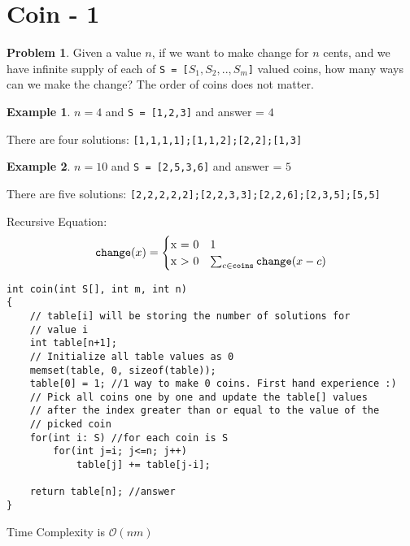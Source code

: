 \documentclass[twoside,12pt,a4paper,english]{book}
\theoremstyle{definition}
\newtheorem*{exmp}{Example}
\theoremstyle{problemstyle}
\newtheorem*{problem}{Problem} %
\theoremstyle{problemstyle}
\theoremstyle{problemstyle}
\begin{document}
\section{Coin - 1}
\begin{problem}
Given a value $n$, if we want to make change for $n$ cents, and we have infinite supply of each of \texttt{S = [$S_1, S_2, .. , S_m$]} valued coins, how many ways can we make the change? The order of coins does not matter.
\end{problem}
\begin{exmp}
$n = 4$ and \texttt{S = [1,2,3]} and answer = $4$

There are four solutions: \texttt{[1,1,1,1];[1,1,2];[2,2];[1,3]}
\end{exmp}
\begin{exmp}
$n = 10$ and \texttt{S = [2,5,3,6]} and answer = $5$

There are five solutions: \texttt{[2,2,2,2,2];[2,2,3,3];[2,2,6];[2,3,5];[5,5]}
\end{exmp}
\begin{tcolorbox}[title=Solution]

Recursive Equation:
\begin{equation*}
    \texttt{change}(x) = \begin{cases}
               $x = 0$ & 1\\
               $x > 0$ & \sum_{c \in \texttt{coins}} \texttt{change}(x-c)\\
           \end{cases}
\end{equation*}
\begin{lstlisting}
int coin(int S[], int m, int n)
{
    // table[i] will be storing the number of solutions for
    // value i
    int table[n+1];
    // Initialize all table values as 0
    memset(table, 0, sizeof(table));
    table[0] = 1; //1 way to make 0 coins. First hand experience :)
    // Pick all coins one by one and update the table[] values
    // after the index greater than or equal to the value of the
    // picked coin
    for(int i: S) //for each coin is S
        for(int j=i; j<=n; j++)
            table[j] += table[j-i];

    return table[n]; //answer
}
\end{lstlisting}
Time Complexity is $\mathcal{O}(nm)$
\end{tcolorbox}
\newpage
\end{document}
